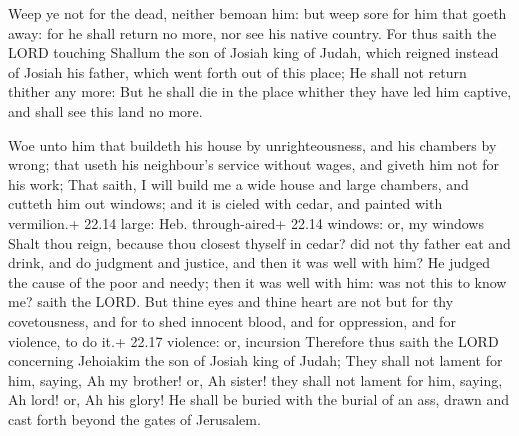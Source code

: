  Weep ye not for the dead, neither bemoan him: but weep
sore for him that goeth away: for he shall return no more, nor see his
native country.  For thus saith the LORD touching Shallum
the son of Josiah king of Judah, which reigned instead of Josiah his
father, which went forth out of this place; He shall not return thither
any more:  But he shall die in the place whither they have
led him captive, and shall see this land no more.

 Woe unto him that buildeth his house by unrighteousness,
and his chambers by wrong; that useth his neighbour's service without
wages, and giveth him not for his work;  That saith, I will
build me a wide house and large chambers, and cutteth him out windows;
and it is cieled with cedar, and painted with vermilion.+ 22.14 large:
Heb. through-aired+ 22.14 windows: or, my windows  Shalt
thou reign, because thou closest thyself in cedar? did not thy father
eat and drink, and do judgment and justice, and then it was well with
him?  He judged the cause of the poor and needy; then it
was well with him: was not this to know me? saith the LORD.
 But thine eyes and thine heart are not but for thy
covetousness, and for to shed innocent blood, and for oppression, and
for violence, to do it.+ 22.17 violence: or, incursion 
Therefore thus saith the LORD concerning Jehoiakim the son of Josiah
king of Judah; They shall not lament for him, saying, Ah my brother! or,
Ah sister! they shall not lament for him, saying, Ah lord! or, Ah his
glory!  He shall be buried with the burial of an ass, drawn
and cast forth beyond the gates of Jerusalem.


